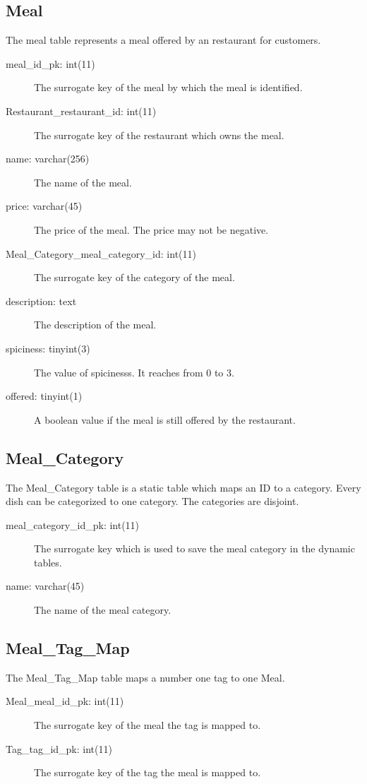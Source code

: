     \subsection{Meal}
    The meal table represents a meal offered by an restaurant for customers.
    \begin{description}
        \item[meal\_id\_pk: int(11)] The surrogate key of the meal by which the meal is identified.
        \item[Restaurant\_restaurant\_id: int(11)] The surrogate key of the restaurant which owns the meal.
        \item[name: varchar(256)] The name of the meal.
        \item[price: varchar(45)] The price of the meal. The price may not be negative.
        \item[Meal\_Category\_meal\_category\_id: int(11)] The surrogate key of the category of the meal.
        \item[description: text] The description of the meal.
        \item[spiciness: tinyint(3)] The value of spicinesss. It reaches from 0 to 3.
        \item[offered: tinyint(1)] A boolean value if the meal is still offered by the restaurant. 
    \end{description}

    \subsection{Meal\_Category}
    The Meal\_Category table is a static table which maps an ID to a category. Every dish can be categorized to one category. The categories are disjoint.
    \begin{description}
        \item[meal\_category\_id\_pk: int(11)] The surrogate key which is used to save the meal category in the dynamic tables.
        \item[name: varchar(45)] The name of the meal category.
    \end{description}

    \subsection{Meal\_Tag\_Map}
    The Meal\_Tag\_Map table maps a number one tag to one Meal.
    \begin{description}
        \item[Meal\_meal\_id\_pk: int(11)] The surrogate key of the meal the tag is mapped to.
        \item[Tag\_tag\_id\_pk: int(11)] The surrogate key of the tag the meal is mapped to.
    \end{description}

